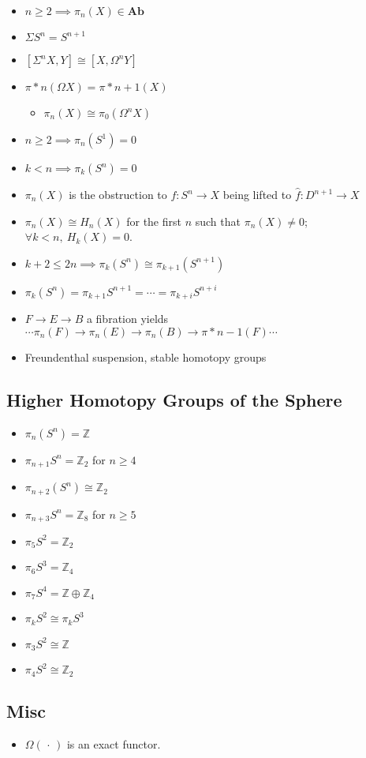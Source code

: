 \begin{itemize}
\item
  \(n \geq 2 \implies \pi_n(X) \in \mathbf{Ab}\)
\item
  \(\Sigma S^n = S^{n+1}\)
\item
  \([\Sigma^n X, Y] \cong [X, \Omega^n Y]\)
\item
  \(\pi*n(\Omega X) = \pi*{n+1}(X)\)

  \begin{itemize}
  \tightlist
  \item
    \(\pi_n(X) \cong \pi_0(\Omega^n X)\)
  \end{itemize}
\item
  \(n\geq 2 \implies \pi_n(S^1) = 0\)
\item
  \(k < n \implies \pi_k(S^n) = 0\)
\item
  \(\pi_n(X)\) is the obstruction to \(f: S^n \to X\) being lifted to
  \(\widehat{f}: D^{n+1} \to X\)
\item
  \(\pi_n(X) \cong H_n(X)\) for the first \(n\) such that
  \(\pi_n(X) \neq 0\); \(\forall k<n, ~H_k(X) = 0\).
\item
  \(k+2 \leq 2n \implies \pi_k(S^n) \cong \pi_{k+1}(S^{n+1})\)
\item
  \(\pi_k(S^n) = \pi_{k+1}S^{n+1} = \cdots =\pi_{k+i}S^{n+i}\)
\item
  \(F\to E \to B\) a fibration yields
  \(\cdots\pi_n(F) \to\pi_n(E) \to\pi_n(B) \to\pi*{n-1}(F) \cdots\)
\item
  Freundenthal suspension, stable homotopy groups
\end{itemize}

\hypertarget{higher-homotopy-groups-of-the-sphere}{%
\subsection{Higher Homotopy Groups of the
Sphere}\label{higher-homotopy-groups-of-the-sphere}}

\begin{itemize}
\tightlist
\item
  \(\pi_n(S^n) = {\mathbb{Z}}\)
\item
  \(\pi_{n+1}S^n = {\mathbb{Z}}_2\) for \(n \geq 4\)
\item
  \(\pi_{n+2}(S^n) \cong {\mathbb{Z}}_2\)
\item
  \(\pi_{n+3}S^n = {\mathbb{Z}}_8\) for \(n\geq 5\)
\item
  \(\pi_5 S^2 = {\mathbb{Z}}_2\)
\item
  \(\pi_6 S^3 = {\mathbb{Z}}_4\)
\item
  \(\pi_7 S^4 = {\mathbb{Z}}\oplus {\mathbb{Z}}_4\)
\item
  \(\pi_k S^2 \cong \pi_k S^3\)
\item
  \(\pi_3 S^2 \cong {\mathbb{Z}}\)
\item
  \(\pi_4 S^2 \cong {\mathbb{Z}}_2\)
\end{itemize}

\hypertarget{misc-1}{%
\subsection{Misc}\label{misc-1}}

\begin{itemize}
\tightlist
\item
  \(\Omega({\,\cdot\,})\) is an exact functor.
\end{itemize}


\printbibliography[title=Bibliography]



